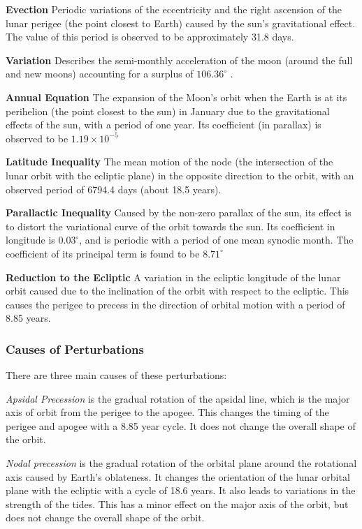 \documentclass[fleqn,10pt]{olplainarticle}
\numberwithin{equation}{subsection}
\begin{document}
\textbf{Evection}
Periodic variations of the eccentricity and the right ascension of the lunar perigee (the point closest to Earth) caused by the sun's gravitational effect. The value of this period is observed to be approximately 31.8 days. \cite{brown1896introductory}

\textbf{Variation}
Describes the semi-monthly acceleration of the moon (around the full and new moons) accounting for a surplus of $106.36^{\circ}$  \cite{1967PASP...79..482T}.

\textbf{Annual Equation}
The expansion of the Moon's orbit when the Earth is at its perihelion (the point closest to the sun) in January due to the gravitational effects of the sun, with a period of one year. Its coefficient (in parallax) is observed to be $1.19 \times 10^{-5}$\cite{brown1896introductory}

\textbf{Latitude Inequality}
The mean motion of the node (the intersection of the lunar orbit with the ecliptic plane) in the opposite direction to the orbit, with an observed period of 6794.4 days (about 18.5 years).\cite{brown1896introductory}

\textbf{Parallactic Inequality}
Caused by the non-zero parallax of the sun, its effect is to distort the variational curve of the orbit towards the sun. Its coefficient in longitude is $0.03^\circ$, and is periodic with a period of one mean synodic month. The coefficient of its principal term is found to be $8.71^{\circ}$\cite{brown1896introductory}

\textbf{Reduction to the Ecliptic}
A variation in the ecliptic longitude of the lunar orbit caused due to the inclination of the orbit with respect to the ecliptic. This causes the perigee to precess in the direction of orbital motion with a period of 8.85 years.

\subsubsection{Causes of Perturbations} 

There are three main causes of these perturbations:

\emph{Apsidal Precession} is the gradual rotation of the apsidal line, which is the major axis of orbit from the perigee to the apogee. This changes the timing of the perigee and apogee with a 8.85 year cycle. It does not change the overall shape of the orbit.

\emph{Nodal precession} is the gradual rotation of the orbital plane around the rotational axis caused by Earth's oblateness. It changes the orientation of the lunar orbital plane with the ecliptic with a cycle of 18.6 years. It also leads to variations in the strength of the tides. This has a minor effect on the major axis of the orbit, but does not change the overall shape of the orbit.
\end{document}
